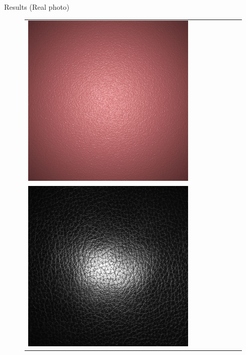 \documentclass[final]{beamer}
\newlength{\twocolwid}
\newlength{\resultwidth}
\begin{document}
\begin{frame}[t]
\begin{columns}[t]
\begin{column}{\twocolwid}
\begin{block}{Results (Real photo)}
\begin{figure}[t]
\begin{tabular}{ccrclccc}
            		\includegraphics[width=\resultwidth]{real/bump/bad1.jpg}
            		\\
            		\includegraphics[width=\resultwidth]{real/leather/target.jpg} &

\end{tabular}
\end{figure}
\end{block}
\end{column}
\end{columns}
\end{frame}
\end{document}
